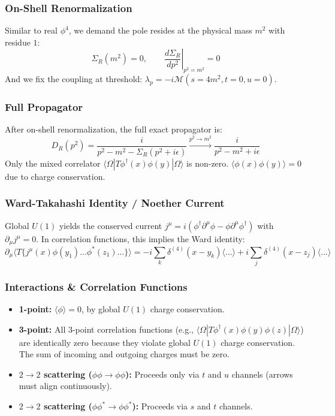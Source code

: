 \documentclass{article}
\begin{document}
\subsubsection*{On-Shell Renormalization}
Similar to real $\phi^4$, we demand the pole resides at the physical mass $m^2$ with residue $1$:
\begin{equation}
    \Sigma_R(m^2) = 0, \qquad \left.\frac{d\Sigma_R}{dp^2}\right|_{p^2=m^2} = 0
\end{equation}
And we fix the coupling at threshold: $\lambda_p = -i\mathcal{M}(s=4m^2, t=0, u=0)$.
\subsubsection*{Full Propagator}
After on-shell renormalization, the full exact propagator is:
\begin{equation}
    D_R(p^2) = \frac{i}{p^2 - m^2 - \Sigma_R(p^2 + i\epsilon)} \xrightarrow{p^2 \to m^2} \frac{i}{p^2 - m^2 + i\epsilon}
\end{equation}
Only the mixed correlator $\langle \Omega | T\phi^\dagger(x) \phi(y) | \Omega \rangle$ is non-zero. $\langle \phi(x)\phi(y) \rangle = 0$ due to charge conservation.
\subsubsection*{Ward-Takahashi Identity / Noether Current}
Global $U(1)$ yields the conserved current $j^\mu = i(\phi^\dagger \partial^\mu \phi - \phi \partial^\mu \phi^\dagger)$ with $\partial_\mu j^\mu = 0$. In correlation functions, this implies the Ward identity:
\begin{equation}
    \partial_\mu \langle T\{j^\mu(x) \phi(y_1) \dots \phi^*(z_1) \dots \} \rangle = -i \sum_k \delta^{(4)}(x - y_k) \langle \dots \rangle + i \sum_j \delta^{(4)}(x - z_j) \langle \dots \rangle
\end{equation}
\subsubsection*{Interactions \& Correlation Functions}
\begin{itemize}
    \item \textbf{1-point:} $\langle \phi \rangle = 0$, by global $U(1)$ charge conservation.
    \item \textbf{3-point:} All 3-point correlation functions (e.g., $\langle \Omega | T\phi^\dagger(x) \phi(y) \phi(z) | \Omega \rangle$) are identically zero because they violate global $U(1)$ charge conservation. The sum of incoming and outgoing charges must be zero.
    \item \textbf{$2 \to 2$ scattering ($\phi \phi \to \phi \phi$):} Proceeds only via $t$ and $u$ channels (arrows must align continuously).
    \item \textbf{$2 \to 2$ scattering ($\phi \phi^* \to \phi \phi^*$):} Proceeds via $s$ and $t$ channels.
\end{itemize}
\end{document}

